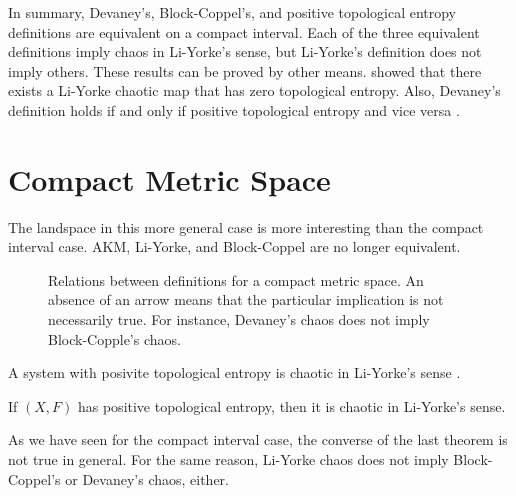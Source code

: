 \documentclass[12pt,twoside,draft]{book}
\begin{document}
In summary, Devaney's, Block-Coppel's, and positive topological entropy definitions are equivalent on a compact interval.
Each of the three equivalent definitions imply chaos in Li-Yorke's sense, but Li-Yorke's definition does not imply others.
These results can be proved by other means.
\citet{smital} showed that there exists a Li-Yorke chaotic map that has zero topological entropy.
Also, Devaney's definition holds if and only if positive topological entropy and vice versa \citep{omegachaos}.


\section{Compact Metric Space}
The landspace in this more general case is more interesting than the compact interval case.
AKM, Li-Yorke, and Block-Coppel are no longer equivalent.
\begin{figure}[ht]
  \label{fig:chaos-metric}
  \caption{
    Relations between definitions for a compact metric space.
    An absence of an arrow means that the particular implication is not necessarily true.
    For instance, Devaney's chaos does not imply Block-Copple's chaos.
  }
\end{figure}

A system with posivite topological entropy is chaotic in Li-Yorke's sense .
\begin{theorem}
  \citep{blanchard}
  If $(X,F)$ has positive topological entropy, then it is chaotic in Li-Yorke's sense.
  \label{thm:entropy-liyorke}
\end{theorem}

As we have seen for the compact interval case, the converse of the last theorem is not true in general.
For the same reason, Li-Yorke chaos does not imply Block-Coppel's or Devaney's chaos, either.
\end{document}
